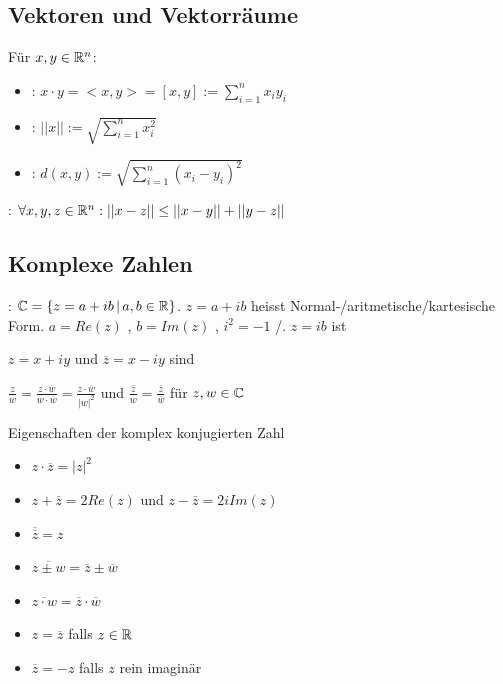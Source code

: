 \subsection{Vektoren und Vektorräume}

\Def Für $x, y \in \mathbb{R}^n$:
\vspace{-0.6em}
\begin{itemize}
    \item {}: $x \cdot y = <x,y> = [x,y] := \sum_{i=1}^{n}x_i y_i$
    \item {}: $||x|| := \sqrt{\sum_{i=1}^{n}x_i^2}$
    \item {}: $d(x,y) := \sqrt{\sum_{i=1}^{n}(x_i-y_i)^2}$
\end{itemize}

\Satz {}: $\forall x,y,z \in \mathbb{R}^n : ||x-z||\le ||x-y|| + ||y - z||$

\subsection{Komplexe Zahlen}

\Def {}: $\mathbb{C} = \{z = a + ib \, | \, a,b \in \mathbb{R}\}$.
$z = a + ib$ heisst Normal-/aritmetische/kartesische Form. $a = Re(z)$ ,
$b = Im(z)$ , $i^2 = -1$ /. $z = ib$ ist 

\Def $z = x + iy$ und $\overline{z} = x - iy$ sind 

\Satz $\frac{z}{w} = \frac{z \cdot \overline{w}}{w \cdot \overline{w}} = \frac{z \cdot \overline{w}}{|w|^2}$
und $\overline{\frac{z}{w}} = \frac{\overline{z}}{\overline{w}}$ für $z,w \in \mathbb{C}$

\Satz Eigenschaften der komplex konjugierten Zahl
\vspace{-0.6em}
\begin{itemize}
    \item $z \cdot \overline{z} = |z|^2$
    \item $z + \overline{z} = 2 Re(z)$ und $z - \overline{z} = 2iIm(z)$
    \item $\overline{\overline{z}} = z$
    \item $\overline{z \pm w} = \overline{z} \pm \overline{w}$
    \item $\overline{z \cdot w} = \overline{z} \cdot \overline{w}$
    \item $z = \overline{z}$ falls $z \in \mathbb{R}$
    \item $\overline{z} = -z$ falls $z$ rein imaginär
\end{itemize}

